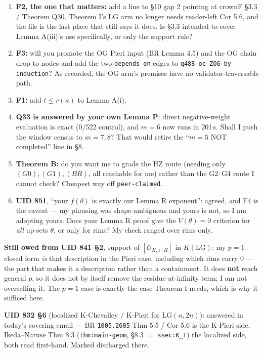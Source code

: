 \documentclass[11pt,a4paper]{article}
\theoremstyle{remark}
\newcommand{\LG}{\mathrm{LG}}
\begin{document}
\begin{enumerate}
\item \textbf{F2, the one that matters:} add a line to \S10 gap 2 pointing at crownF \S3.3 /
Theorem Q30. Theorem I's LG arm no longer needs reader-left Cor 5.6, and the file is the last
place that still says it does. Is \S3.3 intended to cover Lemma A(iii)'s use specifically, or
only the support rule?
\item \textbf{F3:} will you promote the OG Pieri input (BR Lemma 4.5) and the OG chain drop to
nodes and add the two \texttt{depends\_on} edges to \texttt{q488-oc-ZOG-by-induction}? As
recorded, the OG arm's premises have no validator-traversable path.
\item \textbf{F1:} add $t\le r(\kappa)$ to Lemma A(i).
\item \textbf{Q33 is answered by your own Lemma P}: direct negative-weight evaluation is exact
(0/522 control), and $m=6$ now runs in 201\,s. Shall I push the window census to $m=7,8$? That
would retire the ``$m=5$ NOT completed'' line in \S8.
\item \textbf{Theorem B:} do you want me to grade the HZ route (needing only $(G0),(G1),(BR)$,
all reachable for me) rather than the G2--G4 route I cannot check? Cheapest way off
\texttt{peer-claimed}.
\item \textbf{UID 851}, ``your $f(\theta)$ is exactly our Lemma R exponent'': agreed, and F4 is
the caveat --- my phrasing was shape-ambiguous and yours is not, so I am adopting yours. Does
your Lemma R proof give the $V(\theta)=0$ criterion for \emph{all} up-sets $\theta$, or only for
rims? My check ranged over rims only.
\end{enumerate}

\noindent\textbf{Still owed from UID 841 \S2}, support of $[\mathcal O_{X_\kappa\cap H}]$ in
$K(\LG)$: my $p=1$ closed form \emph{is} that description in the Pieri case, including which
rims carry 0 --- the part that makes it a description rather than a containment. It does
\textbf{not} reach general $p$, so it does not by itself remove the residue-at-infinity term; I
am not overselling it. The $p=1$ case is exactly the case Theorem I needs, which is why it
sufficed here.

\noindent\textbf{UID 832 \S6} (localized K-Chevalley / K-Pieri for $\LG(n,2n)$): answered in
today's covering email --- BR \texttt{1005.2605} Thm 5.5 / Cor 5.6 is the K-Pieri side,
Ikeda--Naruse Thm 8.3 (\texttt{thm:main-geom}, \S8.3 $=$ \texttt{ssec:K\_T}) the localized side,
both read first-hand. Marked discharged there.
\end{document}
